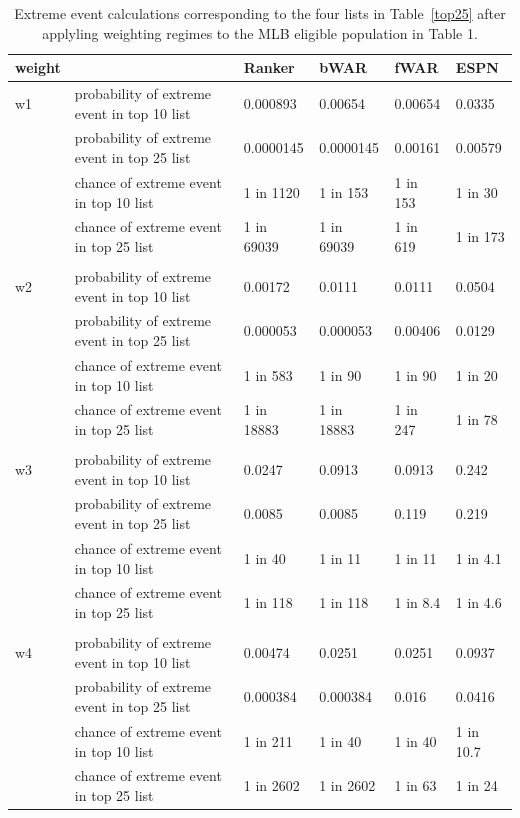 \documentclass[11pt]{article}\usepackage[]{graphicx}\usepackage[]{color}
\begin{document}
\begin{table}[h!]
\begin{center}
\begin{tabular}{llllll}
\hline
 weight & &  Ranker  &  bWAR  &  fWAR  &  ESPN \\
 \hline
w1 & probability of extreme event in top 10 list 
  & 0.000893 
  & 0.00654 
  & 0.00654 
  & 0.0335 \\
& probability of extreme event in top 25 list 
  & 0.0000145 
  & 0.0000145 
  & 0.00161 
  & 0.00579 \\
& chance of extreme event in top 10 list 
  & 1 in 1120 
  & 1 in 153 
  & 1 in 153 
  & 1 in 30 \\
& chance of extreme event in top 25 list 
  & 1 in 69039 
  & 1 in 69039 
  & 1 in 619 
  & 1 in 173 \\
  & & & & & \\
w2 & probability of extreme event in top 10 list 
  & 0.00172 
  & 0.0111 
  & 0.0111 
  & 0.0504 \\
& probability of extreme event in top 25 list 
  & 0.000053 
  & 0.000053 
  & 0.00406 
  & 0.0129 \\
& chance of extreme event in top 10 list 
  & 1 in 583 
  & 1 in 90 
  & 1 in 90 
  & 1 in 20 \\
& chance of extreme event in top 25 list 
  & 1 in 18883 
  & 1 in 18883 
  & 1 in 247 
  & 1 in 78 \\
  & & & & & \\
w3 & probability of extreme event in top 10 list 
  & 0.0247 
  & 0.0913 
  & 0.0913 
  & 0.242 \\
& probability of extreme event in top 25 list 
  & 0.0085 
  & 0.0085 
  & 0.119 
  & 0.219 \\
& chance of extreme event in top 10 list 
  & 1 in 40 
  & 1 in 11 
  & 1 in 11 
  & 1 in 4.1 \\
& chance of extreme event in top 25 list 
  & 1 in 118 
  & 1 in 118 
  & 1 in 8.4 
  & 1 in 4.6 \\
  & & & & & \\  
w4 & probability of extreme event in top 10 list 
  & 0.00474 
  & 0.0251 
  & 0.0251 
  & 0.0937 \\
& probability of extreme event in top 25 list 
  & 0.000384 
  & 0.000384 
  & 0.016 
  & 0.0416 \\
& chance of extreme event in top 10 list 
  & 1 in 211 
  & 1 in 40 
  & 1 in 40 
  & 1 in 10.7 \\
& chance of extreme event in top 25 list 
  & 1 in 2602 
  & 1 in 2602 
  & 1 in 63 
  & 1 in 24 \\
  \hline
\end{tabular}
\end{center}
\caption{Extreme event calculations corresponding to the four lists in 
  Table~\ref{top25} after applyling weighting regimes to the MLB eligible 
  population in Table 1.}
\label{probvalues.weights}
\end{table}
\end{document}
